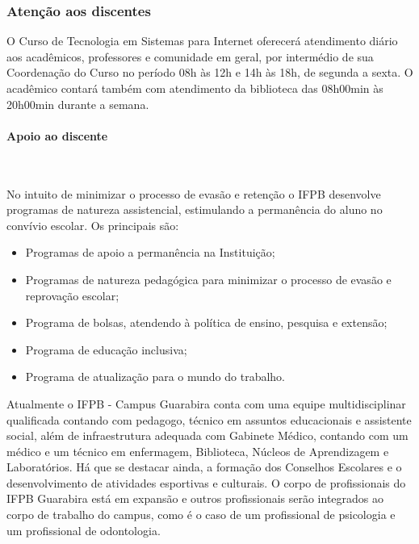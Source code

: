 \subsubsection{Aten\c{c}\~ao aos discentes}

	O Curso de Tecnologia em Sistemas para Internet oferecerá atendimento diário aos acadêmicos, professores e comunidade em geral, por intermédio de sua Coordenação do Curso no período 08h às 12h e 14h às 18h, de segunda a sexta. O acadêmico contará também com atendimento da biblioteca das 08h00min às 20h00min durante a semana.

\paragraph{Apoio ao discente}\

       No intuito de minimizar o processo de evasão e retenção o IFPB desenvolve programas de natureza assistencial, estimulando a permanência do aluno no convívio escolar. Os principais são: 

\begin{itemize}
\item Programas de apoio a permanência na Instituição;

\item Programas de natureza pedagógica para minimizar o processo de evasão e reprovação escolar;

\item Programa de bolsas, atendendo à política de ensino, pesquisa e extensão;

\item Programa de educação inclusiva;

\item Programa de atualização para o mundo do trabalho.
\end{itemize}

      Atualmente o IFPB - Campus Guarabira conta com uma equipe multidisciplinar qualificada contando com pedagogo, técnico em assuntos educacionais e assistente social, além de infraestrutura adequada com Gabinete Médico, contando com um m\'edico e um t\'ecnico em enfermagem, Biblioteca, Núcleos de Aprendizagem e Laboratórios. Há que se destacar ainda, a formação dos Conselhos Escolares e o desenvolvimento de atividades esportivas e culturais. O corpo de profissionais do IFPB Guarabira est\'a em expans\~ao e outros profissionais ser\~ao integrados ao corpo de trabalho do campus, como \'e o caso de um profissional de psicologia e um profissional de odontologia.


